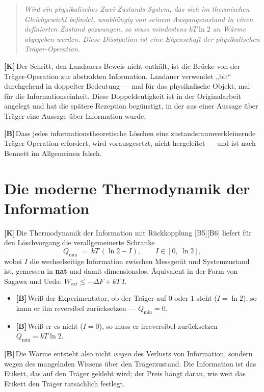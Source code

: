 \documentclass[11pt,a4paper]{article}
\newcommand{\LK}{\textcolor{layK}{\textbf{\footnotesize\textsf{[K]}}}\,}
\newcommand{\LB}{\textcolor{layB}{\textbf{\footnotesize\textsf{[B]}}}\,}
\theoremstyle{ffgft}
\begin{document}
\begin{quote}
\emph{Wird ein physikalisches Zwei-Zustands-System, das sich im thermischen
Gleichgewicht befindet, unabhängig von seinem Ausgangszustand in einen definierten
Zustand gezwungen, so muss mindestens $kT\ln 2$ an Wärme abgegeben werden. Diese
Dissipation ist eine Eigenschaft der physikalischen Träger-Operation.}
\end{quote}

\LK Der Schritt, den Landauers Beweis nicht enthält, ist die Brücke von der
Träger-Operation zur abstrakten Information. Landauer verwendet „bit“ durchgehend
in doppelter Bedeutung --- mal für das physikalische Objekt, mal für die
Informationseinheit. Diese Doppeldeutigkeit ist in der Originalarbeit angelegt und
hat die spätere Rezeption begünstigt, in der aus einer Aussage über Träger eine
Aussage über Information wurde.

\LB Dass jedes informationstheoretische Löschen eine zustandsraumverkleinernde
Träger-Operation erfordert, wird vorausgesetzt, nicht hergeleitet --- und ist nach
Bennett im Allgemeinen falsch.

\section{Die moderne Thermodynamik der Information}

\LK Die Thermodynamik der Information mit Rückkopplung [B5][B6] liefert für den
Löschvorgang die verallgemeinerte Schranke
\begin{equation}
  Q_{\min} \;=\; k T\,(\ln 2 - I), \qquad I \in [0,\ \ln 2],
  \label{eq:feedback}
\end{equation}
wobei $I$ die wechselseitige Information zwischen Messgerät und Systemzustand ist,
gemessen in \textbf{nat} und damit dimensionslos. Äquivalent in der Form von
Sagawa und Ueda: $W_{\text{ext}} \le -\Delta F + kT\,I$.

\begin{itemize}[leftmargin=1.4em,itemsep=0.25em]
  \item \LB Weiß der Experimentator, ob der Träger auf $0$ oder $1$ steht
        ($I = \ln 2$), so kann er ihn reversibel zurücksetzen ---
        $Q_{\min} = 0$.
  \item \LB Weiß er es nicht ($I = 0$), so muss er irreversibel zurücksetzen ---
        $Q_{\min} = kT\ln 2$.
\end{itemize}

\LB Die Wärme entsteht also nicht \emph{wegen} des Verlusts von Information,
sondern wegen des mangelnden Wissens über den Trägerzustand. Die Information ist
das Etikett, das auf den Träger geklebt wird; der Preis hängt daran, wie weit das
Etikett den Träger tatsächlich festlegt.
\end{document}
